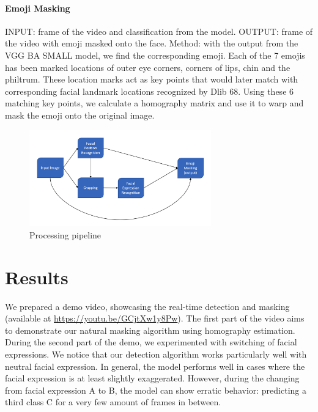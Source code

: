 \documentclass{article}
\begin{document}
\paragraph{Emoji Masking} INPUT: frame of the video and classification from the model. OUTPUT: frame of the video with emoji masked onto the face. Method: with the output from the VGG BA SMALL model, we find the corresponding emoji. Each of the 7 emojis has been marked locations of outer eye corners, corners of lips, chin and the philtrum. These location marks act as key points that would later match with corresponding facial landmark locations recognized by Dlib 68. Using these 6 matching key points, we calculate a homography matrix and use it to warp and mask the emoji onto the original image.
\begin{figure}
    \centering
    \includegraphics[width=0.7\textwidth]{figs/pipeline.png}
    \caption{Processing pipeline}
    \label{fig:pipeline}
\end{figure}

\section{Results}
We prepared a demo video, showcasing the real-time detection and masking (available at  \url{https://youtu.be/GCjtXw1y8Pw}). The first part of the video aims to demonstrate our natural masking algorithm using homography estimation. During the second part of the demo, we experimented with switching of facial expressions. We notice that our detection algorithm works particularly well with neutral facial expression. In general, the model performs well in cases where the facial expression is at least slightly exaggerated. However, during the changing from facial expression A to B, the model can show erratic behavior: predicting a third class C for a very few amount of frames in between. 
\end{document}
